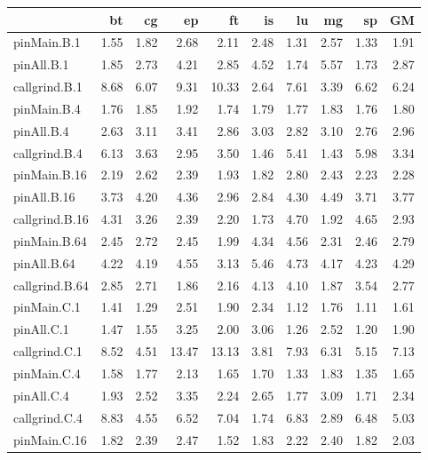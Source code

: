 \begin{table*}[]
\label{comet_sd_pMpAcg_BC_int_p3.5}\begin{center}
\begin{tabular}{|l|rrrrrrrr|r|}
\hline
                &   bt &   cg &    ep &    ft &   is &   lu &   mg &   sp &   GM \\
\hline
 pinMain.B.1    & 1.55 & 1.82 &  2.68 &  2.11 & 2.48 & 1.31 & 2.57 & 1.33 & 1.91 \\
 pinAll.B.1     & 1.85 & 2.73 &  4.21 &  2.85 & 4.52 & 1.74 & 5.57 & 1.73 & 2.87 \\
 callgrind.B.1  & 8.68 & 6.07 &  9.31 & 10.33 & 2.64 & 7.61 & 3.39 & 6.62 & 6.24 \\
\hline
 pinMain.B.4    & 1.76 & 1.85 &  1.92 &  1.74 & 1.79 & 1.77 & 1.83 & 1.76 & 1.80 \\
 pinAll.B.4     & 2.63 & 3.11 &  3.41 &  2.86 & 3.03 & 2.82 & 3.10 & 2.76 & 2.96 \\
 callgrind.B.4  & 6.13 & 3.63 &  2.95 &  3.50 & 1.46 & 5.41 & 1.43 & 5.98 & 3.34 \\
\hline
 pinMain.B.16   & 2.19 & 2.62 &  2.39 &  1.93 & 1.82 & 2.80 & 2.43 & 2.23 & 2.28 \\
 pinAll.B.16    & 3.73 & 4.20 &  4.36 &  2.96 & 2.84 & 4.30 & 4.49 & 3.71 & 3.77 \\
 callgrind.B.16 & 4.31 & 3.26 &  2.39 &  2.20 & 1.73 & 4.70 & 1.92 & 4.65 & 2.93 \\
\hline
 pinMain.B.64   & 2.45 & 2.72 &  2.45 &  1.99 & 4.34 & 4.56 & 2.31 & 2.46 & 2.79 \\
 pinAll.B.64    & 4.22 & 4.19 &  4.55 &  3.13 & 5.46 & 4.73 & 4.17 & 4.23 & 4.29 \\
 callgrind.B.64 & 2.85 & 2.71 &  1.86 &  2.16 & 4.13 & 4.10 & 1.87 & 3.54 & 2.77 \\
\hline
 pinMain.C.1    & 1.41 & 1.29 &  2.51 &  1.90 & 2.34 & 1.12 & 1.76 & 1.11 & 1.61 \\
 pinAll.C.1     & 1.47 & 1.55 &  3.25 &  2.00 & 3.06 & 1.26 & 2.52 & 1.20 & 1.90 \\
 callgrind.C.1  & 8.52 & 4.51 & 13.47 & 13.13 & 3.81 & 7.93 & 6.31 & 5.15 & 7.13 \\
\hline
 pinMain.C.4    & 1.58 & 1.77 &  2.13 &  1.65 & 1.70 & 1.33 & 1.83 & 1.35 & 1.65 \\
 pinAll.C.4     & 1.93 & 2.52 &  3.35 &  2.24 & 2.65 & 1.77 & 3.09 & 1.71 & 2.34 \\
 callgrind.C.4  & 8.83 & 4.55 &  6.52 &  7.04 & 1.74 & 6.83 & 2.89 & 6.48 & 5.03 \\
\hline
 pinMain.C.16   & 1.82 & 2.39 &  2.47 &  1.52 & 1.83 & 2.22 & 2.40 & 1.82 & 2.03 \\

\end{tabular}
\end{center}
\end{table*}
